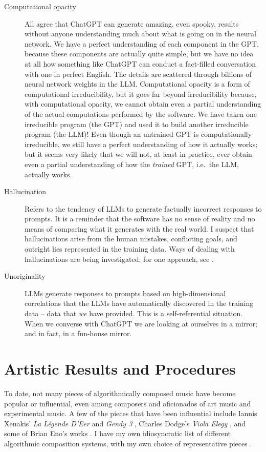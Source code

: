 \documentclass[11pt]{scrartcl}
\begin{document}
\begin{description}
\item[Computational opacity] All agree that ChatGPT can generate amazing, even spooky, results without anyone understanding much about what is going on in the neural network. We have a perfect understanding of each component in the GPT, because these components are actually quite simple, but we have no idea at all how something like ChatGPT can conduct a fact-filled conversation with one in perfect English. The details are scattered through billions of neural network weights in the LLM. Computational opacity is a form of computational irreducibility, but it goes far beyond irreducibility because, with computational opacity, we cannot obtain even a partial understanding of the actual computations performed by the software. We have taken one irreducible program (the GPT) and used it to build another irreducible program (the LLM)! Even though an untrained GPT is computationally irreducible, we still have a perfect understanding of how it actually works; but it seems very likely that we will not, at least in practice, ever obtain even a partial understanding of how the \emph{trained} GPT, i.e.\ the LLM, actually works.
\item [Hallucination] Refers to the tendency of LLMs to generate factually incorrect responses to prompts. It is a reminder that the software has no sense of reality and no means of comparing what it generates with the real world. I suspect that hallucinations arise from the human mistakes, conflicting goals, and outright lies represented in the training data. Ways of dealing with hallucinations are being investigated; for one approach, see \parencite{christiano2017deep}.
\item [Unoriginality] LLMs generate responses to prompts based on high-dimensional correlations that the LLMs have automatically discovered in the training data -- data that \emph{we} have provided. This is a self-referential situation. When we converse with ChatGPT we are looking at ourselves in a mirror; and in fact, in a fun-house mirror.
\end{description}

\section*{Artistic Results and Procedures}

To date, not many pieces of algorithmically composed music have become popular or influential, even among composers and aficionados of art music and experimental music. A few of the pieces that have been influential include Iannis Xenakis' \emph{La Légende D'Eer} \parencite{Solr-8143160} and \emph{Gendy 3} \parencite{gendy3},  Charles Dodge's \emph{Viola Elegy} \parencite{violaelegy}, and some of Brian Eno's works \parencite{eno1996generative, enochilvers}. I have my own idiosyncratic list of different algorithmic composition systems, with my own choice of representative pieces \parencite{rant}.
\end{document}
